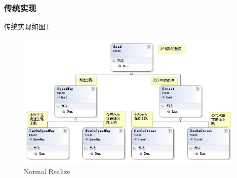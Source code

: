 \documentclass[UTF8,a4paper,12pt]{ctexbook}
\begin{document}
		\subsubsection{传统实现}
		传统实现如图\ref{Bridge1}
		\begin{figure}[h]
			\centering
			\includegraphics[scale= 0.8]{Bridge1.jpg}
			\caption{Normal Realize}
			\label{Bridge1}
		\end{figure}
		
\end{document}
